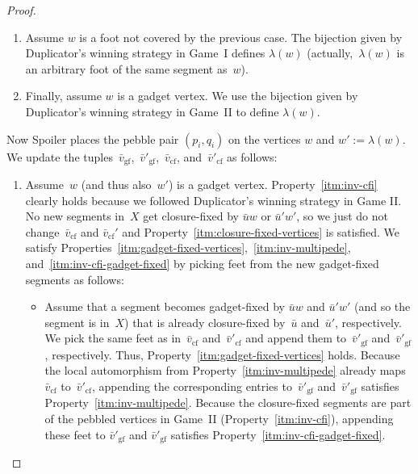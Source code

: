 \documentclass[]{lmcs}
\newcommand{\tup}[1]{\bar{#1}}
\newcommand{\vertA}{u}
\newcommand{\vertB}{v}
\newcommand{\vertC}{w}
\newcommand{\gamebij}{\lambda}
\newcommand{\footbset}{X}
\newcommand{\gadgetfixed}[1]{#1_{\text{gf}}}
\newcommand{\closurefixed}[1]{#1_{\text{cf}}}
\begin{document}
\begin{proof}
\begin{enumerate}[label=(\alph*)]
		\item Assume $\vertC$ is a foot not covered by the previous case. 
		The bijection given by Duplicator's winning strategy in Game~I
		defines $\gamebij(\vertC)$
		(actually,~$\gamebij(\vertC)$ is an arbitrary foot of the same segment as~$\vertC$).
		
		\item Finally, assume $\vertC$ is a gadget vertex.
		We use the bijection given by Duplicator's winning strategy in Game~II
		to define $\gamebij(\vertC)$.
	\end{enumerate}
	Now Spoiler places the pebble pair $(p_i,q_i)$ on the vertices $\vertC$ and  $\vertC' := \gamebij(\vertC)$.
	We update the tuples~$\gadgetfixed{\tup{\vertB}}$,~$\gadgetfixed{\tup{\vertB}'}$,~$\closurefixed{\tup{\vertB}}$, and~$\closurefixed{\tup{\vertB}'}$ as follows:		
	\begin{enumerate}[label=(\alph*)]	
		\item Assume~$\vertC$ (and thus also~$\vertC'$) is a gadget vertex.
		Property~\ref{itm:inv-cfi} clearly holds
		because we followed Duplicator's winning strategy in Game II.
		No new segments in~$\footbset$ get closure-fixed by $\tup{\vertA}\vertC$ or $\tup{\vertA}'\vertC'$,
		so we just do not change~$\closurefixed{\tup{\vertB}}$ and $\closurefixed{\tup{\vertB}}'$
		and Property~\ref{itm:closure-fixed-vertices} is satisfied.
		We satisfy Properties~\ref{itm:gadget-fixed-vertices},~\ref{itm:inv-multipede},
		and~\ref{itm:inv-cfi-gadget-fixed}
		by picking feet from the new gadget-fixed segments as follows:
		\begin{itemize}
		
	
		\item Assume that a segment becomes gadget-fixed by $\tup{\vertA}\vertC$ and $\tup{\vertA}'\vertC'$
		(and so the segment is in~$\footbset$)
		that is already closure-fixed by~$\tup{\vertA}$ and~$\tup{\vertA}'$, respectively.
		We pick the same feet as in~$\closurefixed{\tup{\vertB}}$ and~$\closurefixed{\tup{\vertB}'}$
		and append them to~$\gadgetfixed{\tup{\vertB}'}$ and~$\gadgetfixed{\tup{\vertB}'}$, respectively.
		Thus, Property~\ref{itm:gadget-fixed-vertices} holds.
		Because the local automorphism from Property~\ref{itm:inv-multipede}
		already maps~$\closurefixed{\tup{\vertB}}$ to~$\closurefixed{\tup{\vertB}'}$,
		appending the corresponding entries to~$\gadgetfixed{\tup{\vertB}'}$ and~$\gadgetfixed{\tup{\vertB}'}$ satisfies Property~\ref{itm:inv-multipede}.
		Because the closure-fixed segments are part of
		the pebbled vertices in Game~II (Property~\ref{itm:inv-cfi}),
		appending these feet to $\gadgetfixed{\tup{\vertB}'}$ and $\gadgetfixed{\tup{\vertB}'}$
		satisfies Property~\ref{itm:inv-cfi-gadget-fixed}.
		

\end{itemize}
\end{enumerate}
\end{proof}
\end{document}
